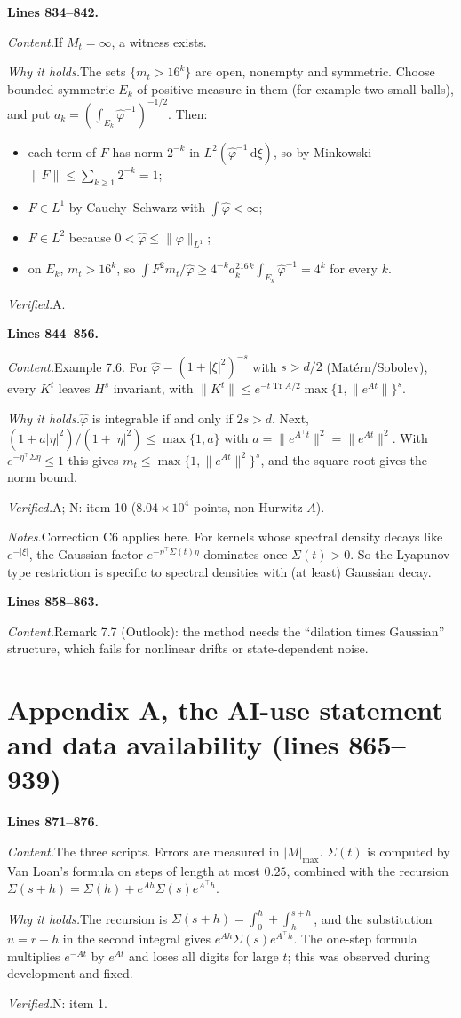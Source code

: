 \documentclass[11pt]{amsart}
\newcommand{\Tr}{\operatorname{Tr}}
\newcommand{\dd}{\,\mathrm{d}}
\newcommand{\hatf}[1]{\widehat{#1}}
\newcommand{\tp}{\top}
\newcommand{\src}[1]{\par\bigskip\noindent\textbf{Lines #1.}\enspace}
\newcommand{\content}{\par\smallskip\noindent\textit{Content.}\enspace}
\newcommand{\why}{\par\smallskip\noindent\textit{Why it holds.}\enspace}
\newcommand{\verified}{\par\smallskip\noindent\textit{Verified.}\enspace}
\newcommand{\notes}{\par\smallskip\noindent\textit{Notes.}\enspace}
\newcommand{\tA}{\textsf{A}}
\newcommand{\tN}{\textsf{N}}
\begin{document}
\src{834--842}
\content If $M_t=\infty$, a witness exists.
\why The sets $\{m_t>16^k\}$ are open, nonempty and symmetric. Choose bounded symmetric $E_k$ of positive measure in
them (for example two small balls), and put $a_k=(\int_{E_k}\hatf\varphi^{-1})^{-1/2}$. Then:
\begin{itemize}
\item each term of $F$ has norm $2^{-k}$ in $L^2(\hatf\varphi^{-1}\dd\xi)$, so by Minkowski $\|F\|\le\sum_{k\ge1}2^{-k}=1$;
\item $F\in L^1$ by Cauchy--Schwarz with $\int\hatf\varphi<\infty$;
\item $F\in L^2$ because $0<\hatf\varphi\le\|\varphi\|_{L^1}$;
\item on $E_k$, $m_t>16^k$, so $\int F^2m_t/\hatf\varphi\ge4^{-k}a_k^216^k\int_{E_k}\hatf\varphi^{-1}=4^k$ for every
$k$.
\end{itemize}
\verified \tA.

\src{844--856}
\content Example 7.6. For $\hatf\varphi=(1+|\xi|^2)^{-s}$ with $s>d/2$ (Mat\'ern/Sobolev), every $K^t$ leaves
$H^s$ invariant, with $\|K^t\|\le e^{-t\Tr A/2}\max\{1,\|e^{At}\|\}^s$.
\why $\hatf\varphi$ is integrable if and only if $2s>d$. Next,
$(1+a|\eta|^2)/(1+|\eta|^2)\le\max\{1,a\}$ with $a=\|e^{A^\tp t}\|^2=\|e^{At}\|^2$. With
$e^{-\eta^\tp\Sigma\eta}\le1$ this gives $m_t\le\max\{1,\|e^{At}\|^2\}^s$, and the square root gives the norm
bound.
\verified \tA; \tN: item 10 ($8.04\times10^4$ points, non-Hurwitz $A$).
\notes Correction C6 applies here. For kernels whose spectral density decays like $e^{-|\xi|}$, the Gaussian factor
$e^{-\eta^\tp\Sigma(t)\eta}$ dominates once $\Sigma(t)>0$. So the Lyapunov-type restriction is specific to spectral
densities with (at least) Gaussian decay.

\src{858--863}
\content Remark 7.7 (Outlook): the method needs the ``dilation times Gaussian'' structure, which fails for nonlinear
drifts or state-dependent noise.

\section{Appendix A, the AI-use statement and data availability (lines 865--939)}\label{sec:app}

\src{871--876}
\content The three scripts. Errors are measured in $|M|_{\max}$. $\Sigma(t)$ is computed by Van Loan's formula on steps
of length at most $0.25$, combined with the recursion $\Sigma(s+h)=\Sigma(h)+e^{Ah}\Sigma(s)e^{A^\tp h}$.
\why The recursion is $\Sigma(s+h)=\int_0^h+\int_h^{s+h}$, and the substitution $u=r-h$ in the second integral
gives $e^{Ah}\Sigma(s)e^{A^\tp h}$. The one-step formula multiplies $e^{-At}$ by $e^{At}$ and loses all digits for
large $t$; this was observed during development and fixed.
\verified \tN: item 1.
\end{document}
